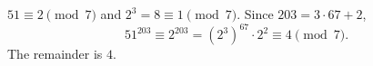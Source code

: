 \(51\equiv2\pmod7\) and \(2^3=8\equiv1\pmod 7\). Since \(203=3\cdot67+2\),
\[
51^{203}\equiv2^{203}=(2^3)^{67}\cdot2^2\equiv4\pmod7 .
\]
The remainder is \(\boxed{4}\).
